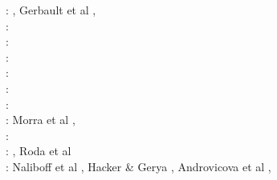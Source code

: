 \begin{scriptsize}
\twothousandthree: \cite{refm03}\cite{fumr03}, Gerbault et al \cite{gehd03}, \cite{bigs03}\\
\twothousandfour: \cite{toba04}\cite{bocj04}\cite{bejn04}\cite{tobj04}\cite{sche04}\cite{sche04b}\cite{enwi04}
      \cite{geys04}\\
\twothousandfive: \cite{jalo05}\cite{lahb05}\cite{gowo05}\cite{enbs05}\cite{artd05}\cite{gowo05}
      \cite{mage05}\cite{stge05}\cite{sche05}\cite{lahb05}\\
\twothousandsix: \cite{degw06}\cite{rohu06}\cite{masr06}\cite{gest06}\cite{fump06}\cite{pibf06}\cite{stfs06}
      \cite{libi06}\cite{hapf06}\cite{sobk06}\cite{syab06}\\
\twothousandseven: \cite{artd07}\cite{yaab07}\cite{cubh07}\cite{civv07}\cite{masp07}\cite{camg07}\cite{scfs07}
      \cite{gogg07}\cite{gowg07}\cite{magu07}\cite{moct07}\cite{onlm07}\cite{lohd07}\cite{zldf07}
      \cite{bihi07}\\
\twothousandeight: \cite{yaba08}\cite{ozrs08}\cite{dihf08}\cite{wabj08}\cite{wabj08b}\cite{boht08b}
      \cite{migb08}\cite{boht08a}\cite{baso08}\cite{fagc08}\cite{gecy08}\cite{fufh08}\cite{buya08}
      \cite{degw08}\cite{degw08b}\cite{gepb08}\cite{nigc08}\cite{sebp08}\cite{cuhb08}\cite{wuch08}
      \cite{divf08}\\
\twothousandnine: 
\cite{yahb09}\cite{bill09}\cite{fagb09}\cite{bejb09}\cite{kecw09}\cite{gecm09}\cite{gefc09}
\cite{famg09}\cite{lige09}\cite{moct09}\cite{lohb09}\cite{befa09}\cite{agyj09}\cite{yamb09}
\cite{huby09}\\
\twothousandten: 
\cite{hagr10}\cite{lobh10}\cite{mamb10}\cite{camg10}\cite{casm10}\cite{ligb10}\cite{stfc10}
Morra et al \cite{moyb10}, \cite{zhst10}\cite{qusp10}\cite{moht10}\cite{leki10}\cite{sigb10}\cite{stsf10}
\cite{syva10}\\
\twothousandeleven: 
\cite{lixg11}\cite{list11}\cite{bubj11}\cite{bagw11b}\cite{cafz11}\cite{geme11}\cite{qube11}
\cite{blgg11}\cite{gery11b}\cite{leki11}\cite{scsf11}\cite{gopc11}\cite{gocm11}\\
\twothousandtwelve: 
\cite{anwb12}\cite{jahu12}\cite{jabi12}\cite{jabk12}\cite{lixg12}\cite{grpy12}\cite{grpy12b}
\cite{ronb12}\cite{tebu12}\cite{thka12}\cite{bova12}\cite{civs12}\cite{camo12}\cite{cafa12} 
\cite{gebk12}\cite{liri12}\cite{beva12}\cite{uegb12}\cite{bija12}\cite{sigb12}\cite{vogc12}
\cite{buqm12}\cite{yoth12}\cite{gigh12}\cite{vakn12}, Roda et al \cite{rosm12}\\
\twothousandthirteen: 
Naliboff et al \cite{nabg13}, Hacker \& Gerya \cite{hage13}, Androvicova et al \cite{ancv13},

\end{scriptsize}

